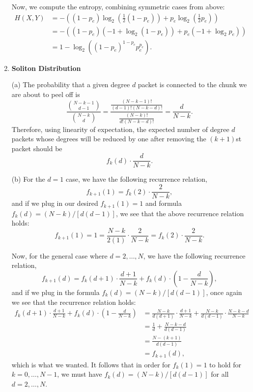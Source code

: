 \begin{enumerate}
    Now, we compute the entropy, combining symmetric cases from above:
    \begin{align*}
        H(X, Y) &= -\left((1 - p_e)\log_2\left(\frac{1}{2}(1 - p_e)\right) + p_e\log_2\left(\frac{1}{2}p_e\right)\right) \\
            &= -\left((1 - p_e)(-1 + \log_2(1 - p_e)) + p_e(-1 + \log_2p_e)\right) \\
            &= 1 - \log_2\left((1 - p_e)^{1 - p_e}p_e^{p_e}\right).
    \end{align*}
    
    \item \textbf{Soliton Distribution}
    
    (a) The probability that a given degree $d$ packet is connected to the chunk we are about to peel off is
    \[
        \frac{\binom{N - k - 1}{d - 1}}{\binom{N - k}{d}} = \frac{\frac{(N - k - 1)!}{(d - 1)!(N - k - d)!}}{\frac{(N - k)!}{d!(N - k - d)!}} = \frac{d}{N - k}.
    \]
    Therefore, using linearity of expectation, the expected number of degree $d$ packets whose degrees will be reduced by one after removing the $(k + 1)$st packet should be 
    \[
    f_k(d) \cdot \frac{d}{N - k}.
    \]
    
    (b) For the $d = 1$ case, we have the following recurrence relation,
    \[
        f_{k + 1}(1) = f_k(2) \cdot \frac{2}{N - k},
    \]
    and if we plug in our desired $f_{k + 1}(1) = 1$ and formula $f_k(d) = (N - k)/[d(d - 1)]$, we see that the above recurrence relation holds:
    \[
        f_{k + 1}(1) = 1 = \frac{N - k}{2(1)} \cdot \frac{2}{N - k} = f_k(2) \cdot \frac{2}{N - k}.
    \]
    
    Now, for the general case where $d = 2,\dots,N$, we have the following recurrence relation,
    \[
        f_{k + 1}(d) = f_k(d + 1)\cdot\frac{d + 1}{N - k} + f_k(d)\cdot\left(1 - \frac{d}{N - k}\right),
    \]
    and if we plug in the formula $f_k(d) = (N - k)/[d(d - 1)]$, once again we see that the recurrence relation holds:
    \begin{align*}
        f_k(d + 1)\cdot\frac{d + 1}{N - k} + f_k(d)\cdot\left(1 - \frac{d}{N - k}\right) &= \frac{N - k}{d(d + 1)}\cdot\frac{d + 1}{N - k} + \frac{N - k}{d(d - 1)}\cdot\frac{N - k - d}{N - k} \\
            &= \frac{1}{d} + \frac{N - k - d}{d(d - 1)} \\
            &= \frac{N - (k + 1)}{d(d - 1)} \\
            &= f_{k + 1}(d),
    \end{align*}
    which is what we wanted. It follows that in order for $f_k(1) = 1$ to hold for $k = 0,\dots,N - 1$, we must have $f_k(d) = (N - k)/[d(d - 1)]$ for all $d = 2,\dots,N$.
    

\end{enumerate}
